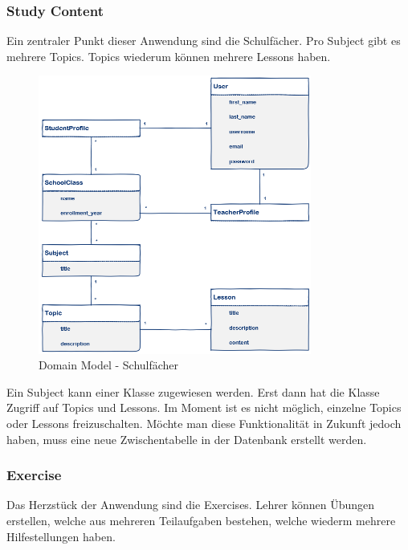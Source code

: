 \newpage
\subsubsection*{Study Content}
Ein zentraler Punkt dieser Anwendung sind die Schulfächer. Pro Subject gibt es mehrere Topics. Topics wiederum können mehrere Lessons haben. \\ 

\begin{figure}[H]
\begin{center}
	\includegraphics[width=0.8\textwidth, keepaspectratio]{images/domain_model_study_content.png}
	\caption{Domain Model - Schulfächer}
	\label{fig:domain_model_study_content}
\end{center}
\end{figure}


Ein Subject kann einer Klasse zugewiesen werden. Erst dann hat die Klasse Zugriff auf Topics und Lessons. Im Moment ist es nicht möglich, einzelne Topics oder Lessons freizuschalten. Möchte man diese Funktionalität in Zukunft jedoch haben, muss eine neue Zwischentabelle in der Datenbank erstellt werden.

\newpage
\subsubsection*{Exercise}
Das Herzstück der Anwendung sind die Exercises. Lehrer können Übungen erstellen, welche aus mehreren Teilaufgaben bestehen, welche wiederm mehrere Hilfestellungen haben. 

